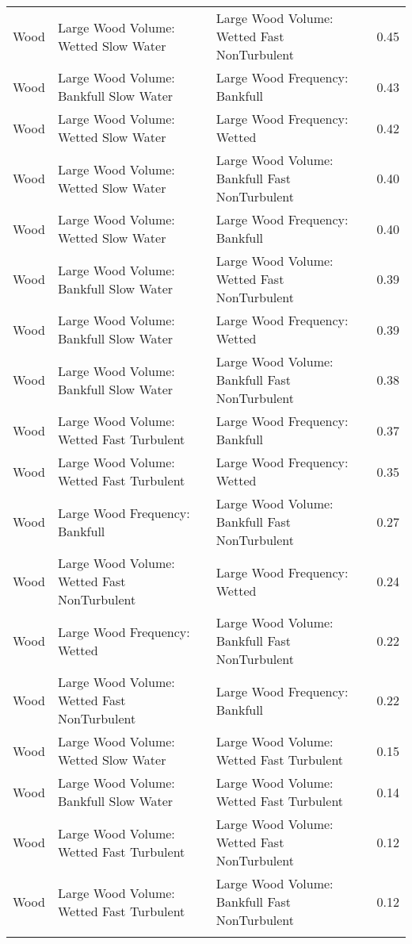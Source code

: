 \documentclass[
  12pt,
]{article}
\begin{document}
\begin{longtable}[t]{>{\raggedright\arraybackslash}p{1in}>{\raggedright\arraybackslash}p{2in}>{\raggedright\arraybackslash}p{2in}r}
Wood & Large Wood Volume: Wetted Slow Water & Large Wood Volume: Wetted Fast NonTurbulent & 0.45\\
Wood & Large Wood Volume: Bankfull Slow Water & Large Wood Frequency: Bankfull & 0.43\\
\addlinespace
Wood & Large Wood Volume: Wetted Slow Water & Large Wood Frequency: Wetted & 0.42\\
Wood & Large Wood Volume: Wetted Slow Water & Large Wood Volume: Bankfull Fast NonTurbulent & 0.40\\
Wood & Large Wood Volume: Wetted Slow Water & Large Wood Frequency: Bankfull & 0.40\\
Wood & Large Wood Volume: Bankfull Slow Water & Large Wood Volume: Wetted Fast NonTurbulent & 0.39\\
Wood & Large Wood Volume: Bankfull Slow Water & Large Wood Frequency: Wetted & 0.39\\
\addlinespace
Wood & Large Wood Volume: Bankfull Slow Water & Large Wood Volume: Bankfull Fast NonTurbulent & 0.38\\
Wood & Large Wood Volume: Wetted Fast Turbulent & Large Wood Frequency: Bankfull & 0.37\\
Wood & Large Wood Volume: Wetted Fast Turbulent & Large Wood Frequency: Wetted & 0.35\\
Wood & Large Wood Frequency: Bankfull & Large Wood Volume: Bankfull Fast NonTurbulent & 0.27\\
Wood & Large Wood Volume: Wetted Fast NonTurbulent & Large Wood Frequency: Wetted & 0.24\\
\addlinespace
Wood & Large Wood Frequency: Wetted & Large Wood Volume: Bankfull Fast NonTurbulent & 0.22\\
Wood & Large Wood Volume: Wetted Fast NonTurbulent & Large Wood Frequency: Bankfull & 0.22\\
Wood & Large Wood Volume: Wetted Slow Water & Large Wood Volume: Wetted Fast Turbulent & 0.15\\
Wood & Large Wood Volume: Bankfull Slow Water & Large Wood Volume: Wetted Fast Turbulent & 0.14\\
Wood & Large Wood Volume: Wetted Fast Turbulent & Large Wood Volume: Wetted Fast NonTurbulent & 0.12\\
\addlinespace
Wood & Large Wood Volume: Wetted Fast Turbulent & Large Wood Volume: Bankfull Fast NonTurbulent & 0.12\\*
\end{longtable}

\newpage
\end{document}
